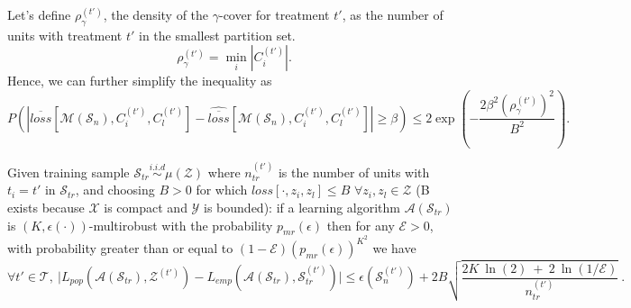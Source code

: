 Let's define $\rho^{(t')}_{\gamma}$, the density of the $\gamma$-cover for treatment $t'$, as the number of units with treatment $t'$ in the smallest partition set. 
$$\rho^{(t')}_{\gamma} = \min_i |C^{(t')}_i|.$$
Hence, we can further simplify the inequality as 
$$P\left(\left| \overline{loss}[\mathcal{M}(\mathcal{S}_n),C^{(t')}_i,C^{(t')}_l] - \widehat{\overline{loss}}[\mathcal{M}(\mathcal{S}_n),C^{(t')}_i,C^{(t')}_l] \right|\geq\beta\right) \leq  2\exp\left(-\frac{2\beta^2(\rho^{(t')}_\gamma)^2}{B^2}\right).
$$

\begin{lemma}
\label{lm: whpavgloss}
Given training sample $\mathcal{S}_{tr}\overset{i.i.d}{\sim}\mu(\mathcal{Z})$ where $n_{tr}^{(t')}$ is the number of units with $t_i=t'$ in $\mathcal{S}_{tr}$, and choosing $B>0$ for which $loss[\cdot,z_i,z_l]\leq B$ $\forall z_i,z_l\in\mathcal{Z}$ (B exists because $\mathcal{X}$ is compact and $\mathcal{Y}$ is bounded): if a learning algorithm $\mathcal{A}(\mathcal{S}_{tr})$ is $(K,\epsilon(\cdot))$-multirobust with the probability $p_{mr}(\epsilon)$ then for any $\mathcal{E}>0$, with probability greater than or equal to $(1-\mathcal{E})(p_{mr}(\epsilon))^{K^2}$ we have
$$\forall t'\in\mathcal{T},~\Big| L_{pop}(\mathcal{A}(\mathcal{S}_{tr}),\mathcal{Z}^{(t')}) - L_{emp}(\mathcal{A}(\mathcal{S}_{tr}),\mathcal{S}_{tr}^{(t')}) \Big| \leq \epsilon(\mathcal{S}^{(t')}_n) + 2B\sqrt{\frac{2K~\ln(2)~+~2~\ln(1/\mathcal{E})}{n_{tr}^{(t')}}}~.$$
\end{lemma}

